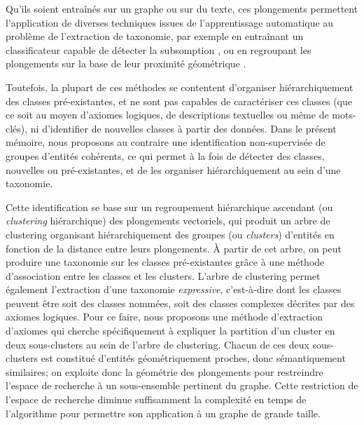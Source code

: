 
Qu'ils soient entraînés sur un graphe ou sur du texte, ces plongements permettent l'application de diverses techniques issues de l'apprentissage automatique au problème de l'extraction de taxonomie, par exemple en entraînant un classificateur capable de détecter la subsomption \cite{fu2014learning}, ou en regroupant les plongements sur la base de leur proximité géométrique \cite{gupta2016domain, zhang2018taxogen}.


Toutefois, la plupart de ces méthodes se contentent d'organiser hiérarchiquement des classes pré-existantes, et ne sont pas capables de caractériser ces classes (que ce soit au moyen d'axiomes logiques, de descriptions textuelles ou même de mots-clés), ni d'identifier de nouvelles classes à partir des données.
%
Dans le présent mémoire, nous proposons au contraire une identification non-supervisée de groupes d'entités cohérents, ce qui permet à la fois de détecter des classes, nouvelles ou pré-existantes, et de les organiser hiérarchiquement au sein d'une taxonomie.

Cette identification se base sur un regroupement hiérarchique ascendant (ou \textit{clustering} hiérarchique) des plongements vectoriels, qui produit un arbre de clustering organisant hiérarchiquement des groupes (ou \textit{clusters}) d'entités en fonction de la distance entre leurs plongements. À partir de cet arbre, on peut produire une taxonomie sur les classes pré-existantes grâce à une méthode d'association entre les classes et les clusters. L'arbre de clustering permet également l'extraction d'une taxonomie \textit{expressive}, c'est-à-dire dont les classes peuvent être soit des classes nommées, soit des classes complexes décrites par des axiomes logiques. Pour ce faire, nous proposons une méthode d'extraction d'axiomes qui cherche spécifiquement à expliquer la partition d'un cluster en deux sous-clusters au sein de l'arbre de clustering. Chacun de ces deux sous-clusters est constitué d'entités géométriquement proches, donc sémantiquement similaires; on exploite donc la géométrie des plongements pour restreindre l'espace de recherche à un sous-ensemble pertinent du graphe. Cette restriction de l'espace de recherche diminue suffisamment la complexité en temps de l'algorithme pour permettre son application à un graphe de grande taille.

